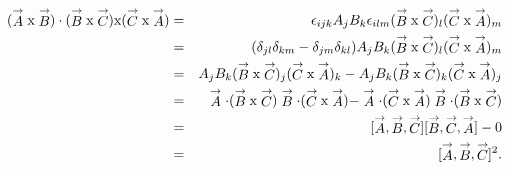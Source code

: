 {\begin{eqnarray*}
(\stackrel{\rightarrow}{A} \textup{x} \stackrel{\rightarrow}{B})\cdot (\stackrel{\rightarrow}{B} \textup{x} \stackrel{\rightarrow}{C}) \textup{x} (\stackrel{\rightarrow}{C} \textup{x} \stackrel{\rightarrow}{A})&=&
\epsilon_{ijk}A_jB_k\epsilon_{ilm}(\stackrel{\rightarrow}{B} \textup{x} \stackrel{\rightarrow}{C})_l (\stackrel{\rightarrow}{C} \textup{x} \stackrel{\rightarrow}{A})_m\\
&=&
(\delta_{jl}\delta_{km}-\delta_{jm}\delta_{kl}) A_jB_k(\stackrel{\rightarrow}{B} \textup{x} \stackrel{\rightarrow}{C})_l (\stackrel{\rightarrow}{C} \textup{x} \stackrel{\rightarrow}{A})_m\\
&=&A_jB_k(\stackrel{\rightarrow}{B} \textup{x} \stackrel{\rightarrow}{C})_j (\stackrel{\rightarrow}{C} \textup{x} \stackrel{\rightarrow}{A})_k - A_jB_k(\stackrel{\rightarrow}{B} \textup{x} \stackrel{\rightarrow}{C})_k (\stackrel{\rightarrow}{C} \textup{x} \stackrel{\rightarrow}{A})_j \\
&=& \stackrel{\rightarrow}{A}\cdot(\stackrel{\rightarrow}{B} \textup{x} \stackrel{\rightarrow}{C})\stackrel{\rightarrow}{B}\cdot(\stackrel{\rightarrow}{C} \textup{x} \stackrel{\rightarrow}{A})-
\stackrel{\rightarrow}{A}\cdot(\stackrel{\rightarrow}{C} \textup{x} \stackrel{\rightarrow}{A})\stackrel{\rightarrow}{B}\cdot(\stackrel{\rightarrow}{B} \textup{x} \stackrel{\rightarrow}{C})\\
&=&[\stackrel{\rightarrow}{A} , \stackrel{\rightarrow}{B} , \stackrel{\rightarrow}{C}][\stackrel{\rightarrow}{B} , \stackrel{\rightarrow}{C} , \stackrel{\rightarrow}{A}]-0\\
&=&[\stackrel{\rightarrow}{A} , \stackrel{\rightarrow}{B} , \stackrel{\rightarrow}{C}]^2.
\end{eqnarray*}



\vspace{.1in}

}
